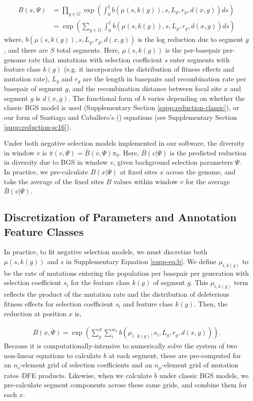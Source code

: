 \documentclass[11pt]{article}
\begin{document}
\begin{align}
  \label{supp-eq:b}
  B(x, \Psi) &= \prod_{g \in G} \exp \left( \int_0^1 b(\mu(s, k(g)), s, L_g, r_g, d(x, g)) ds \right) \nonumber  \\
             &= \exp \left( \sum_{g \in G} \int_0^1 b(\mu(s, k(g)), s, L_g, r_g, d(x, g)) ds \right)
\end{align}
%
where, $b(\mu(s, k(g)), s, L_g, r_g, d(x,g))$ is the log reduction due to
segment $g$, and there are $S$ total segments. Here, $\mu(s, k(g))$ is the
per-basepair per-genome rate that mutations with selection coefficient $s$
enter segments with feature class $k(g)$ (e.g. it incorporates the distribution
of fitness effects and mutation rate), $L_g$ and $r_g$ are the length in
basepairs and recombination rate per basepair of segment $g$, and the
recombination distance between focal site $x$ and segment $g$ is $d(x, g)$. The
functional form of $b$ varies depending on whether the classic BGS model is
used (Supplementary Section \ref{supp:reduction-classic}), or our form of
Santiago and Caballero's (\citeyear{Santiago2016-mu}) equations (see
Supplementary Section \ref{supp:reduction-sc16}).

Under both negative selection models implemented in our software, the diversity
in window $v$ is $\bar{\pi}(v, \Psi) = \bar{B}(v, \Psi) \pi_0$. Here,
$\bar{B}(v | \Psi)$ is the predicted reduction in diversity due to BGS in
window $v$, given background selection parameters $\Psi$. In practice, we
pre-calculate $B(x | \Psi)$ at fixed sites $x$ across the genome, and take the
average of the fixed sites $B$ values within window $v$ for the average
$\bar{B}(v | \Psi)$. 

\subsection{Discretization of Parameters and Annotation Feature Classes}

In practice, to fit negative selection models, we must discretize both $\mu(s,
k(g))$ and $s$ in Supplementary Equation \eqref{supp-eq:b}. We define
$\mu_{i,k(g)}$ to be the rate of mutations entering the population per basepair
per generation with selection coefficient $s_i$ for the feature class $k(g)$ of
segment $g$. This $\mu_{i, k(g)}$ term reflects the product of the mutation
rate and the distribution of deleterious fitness effects for selection
coefficient $s_i$ and feature class $k(g)$. Then, the reduction at position $x$
is,

\begin{align}
  \label{supp-eq:b-disc}
  B(x, \Psi) = \exp \left( \sum_g^S \sum_{i}^{m_s} b(\mu_{i, \;k(g)}, s_i, L_g, r_g, d(x, g))\right).
\end{align}
%
Because it is computationally-intensive to numerically solve the system of two
non-linear equations to calculate $b$ at each segment, these are pre-computed
for an $n_s$-element grid of selection coefficients and an $n_\mu$-element grid
of mutation rates--DFE products. Likewise, when we calculate $b$ under classic
BGS models, we pre-calculate segment components across these same grids, and
combine them for each $x$.
\end{document}
